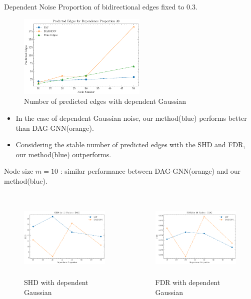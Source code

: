 \documentclass{beamer}
\begin{document}
\begin{frame}[allowframebreaks]{Dependent Noise}
    Proportion of bidirectional edges fixed to 0.3.
    \begin{figure}
        \centering
        \includegraphics[height=4cm]{fig/Predicted Edges_dependence_30.pdf}
        \caption{Number of predicted edges with dependent Gaussian}
        \label{fig:dep_gaussian_edges}
    \end{figure}
    \begin{itemize}
        \item In the case of dependent Gaussian noise, our method(blue) performs better than DAG-GNN(orange).
        \item Considering the stable number of predicted edges with the SHD and FDR, our method(blue) outperforms.
    \end{itemize}

    Node size $m=10$ : similar performance between DAG-GNN(orange) and our method(blue).
    \begin{columns}
        \begin{column}{0.5\textwidth}
            \begin{figure}
                \centering
                \includegraphics[height=4cm]{fig/SHD_dependence_10_DAG_threshold0.3.pdf}
                \caption{SHD with dependent Gaussian}
                \label{fig:dep_gaussian_shd_10}
            \end{figure}
        \end{column}
        \begin{column}{0.5\textwidth}
            \begin{figure}
                \centering
                \includegraphics[height=4cm]{fig/FDR_dependence_10_DAG_threshold0.3.pdf}
                \caption{FDR with dependent Gaussian}
                \label{fig:dep_gaussian_fdr_10}
            \end{figure}
        \end{column}
    \end{columns}


\end{frame}
\end{document}
